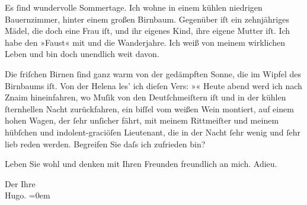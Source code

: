 \pstart
           Es{ }ſind wundervolle Sommertage. Ich wohne in einem kühlen niedrigen Bauernzimmer,
               hinter einem großen Birnbaum. Gegenüber iſt ein zehnjähriges Mädel, die doch eine
               Frau iſt, und ihr eigenes Kind, ihre eigene Mutter iſt. Ich habe den »Faust« mit und die Wanderjahre. Ich weiß von meinem {\pb}wirklichen Leben und bin doch
               unendlich weit davon.\pend
           
\pstart
           Die friſchen Birnen{ }ſind ganz warm von der gedämpften Sonne, die im Wipfel des
               Birnbaums iſt. Von der Helena les’ ich dieſen
               Vers: »\label{K_L00476-2v}\label{K_L00476-2}« Heute abend werd ich nach Znaim hineinfahren, wo Muſik von den Deutſchmeiſtern iſt und in der kühlen{ }ſternhellen Nacht zurückfahren, ein
               biſſel vom weißen Wein montiert, auf einem hohen Wagen, der{ }ſehr {\pb}unſicher fährt, mit meinem
               Rittmeiſter und meinem hübſchen und indolent-graciöſen Lieutenant, die in der Nacht{ }ſehr wenig und{ }ſehr lieb reden werden. Begreifen Sie daſs ich zufrieden bin?\pend
           
\pstart
           Leben Sie wohl und denken mit Ihren Freunden freundlich an mich. Adieu.\pend
           
\pstart
           Der Ihre{\\[\baselineskip]}\spacefill\mbox{Hugo.}\pend
           \leftskip=0em{}\endnumbering{}  \newcommand{\dateiname}{L00476}\newcommand{\titel}{Hugo von Hofmannsthal an Arthur Schnitzler, 21. [8. 1895]}\newcommand{\editorInnen}{Martin Anton Müller und Gerd-Hermann Susen}

